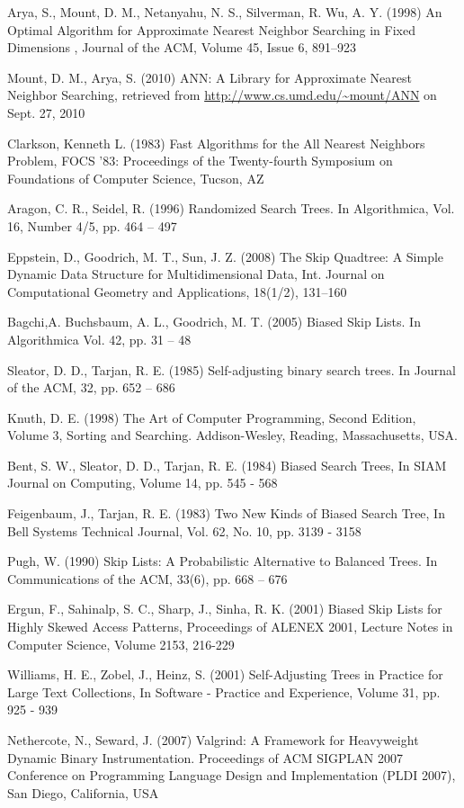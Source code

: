 \documentclass[mcs]{scsthesis}
\begin{document}
\begin{thebibliography}{5}

    Arya, S., Mount, D. M., Netanyahu, N. S., Silverman, R. Wu, A. Y. (1998) An Optimal Algorithm for Approximate Nearest Neighbor Searching in Fixed Dimensions , Journal of the ACM, Volume 45, Issue 6, 891--923

    Mount, D. M., Arya, S. (2010) ANN: A Library for Approximate Nearest Neighbor Searching, retrieved from \url{http://www.cs.umd.edu/~mount/ANN} on Sept. 27, 2010


    Clarkson, Kenneth L. (1983) Fast Algorithms for the All Nearest Neighbors Problem,
FOCS '83: Proceedings of the Twenty-fourth Symposium on Foundations of Computer Science,
Tucson, AZ 
 
Aragon, C. R.,  Seidel, R. (1996) Randomized Search Trees.
In Algorithmica, Vol. 16, Number 4/5, pp. 464 – 497

    Eppstein, D., Goodrich, M. T., Sun, J. Z. (2008) The Skip Quadtree: A Simple Dynamic Data Structure for Multidimensional Data, Int. Journal on Computational Geometry and Applications, 18(1/2), 131--160 

Bagchi,A. Buchsbaum, A. L., Goodrich, M. T. (2005) Biased Skip Lists.
In Algorithmica Vol. 42, pp. 31 – 48
 
Sleator, D. D., Tarjan, R. E. (1985) Self-adjusting binary search trees.
In Journal of the ACM, 32, pp. 652 – 686

Knuth, D. E. (1998) The Art of Computer Programming, Second Edition,
Volume 3, Sorting and Searching.  Addison-Wesley, Reading, Massachusetts, USA.

Bent, S. W., Sleator, D. D., Tarjan, R. E. (1984) Biased Search Trees,
In SIAM Journal on Computing, Volume 14, pp. 545 - 568

Feigenbaum, J., Tarjan, R. E. (1983) Two New Kinds of Biased Search Tree,
In Bell Systems Technical Journal, Vol. 62, No. 10, pp. 3139 - 3158

Pugh, W. (1990) Skip Lists: A Probabilistic Alternative to Balanced Trees.
In Communications of the ACM, 33(6), pp. 668 – 676

Ergun, F., Sahinalp, S. C., Sharp, J., Sinha, R. K. (2001) Biased Skip Lists
for Highly Skewed Access Patterns, Proceedings of ALENEX 2001, Lecture Notes in
Computer Science, Volume 2153, 216-229

Williams, H. E., Zobel, J., Heinz, S. (2001) Self-Adjusting Trees in Practice
for Large Text Collections, In Software - Practice and Experience,
Volume 31, pp. 925 - 939

Nethercote, N., Seward, J. (2007) Valgrind: A Framework for Heavyweight Dynamic
Binary Instrumentation.  Proceedings of ACM SIGPLAN 2007 Conference on
Programming Language Design and Implementation (PLDI 2007),
San Diego, California, USA

\end{thebibliography}
\end{document}
